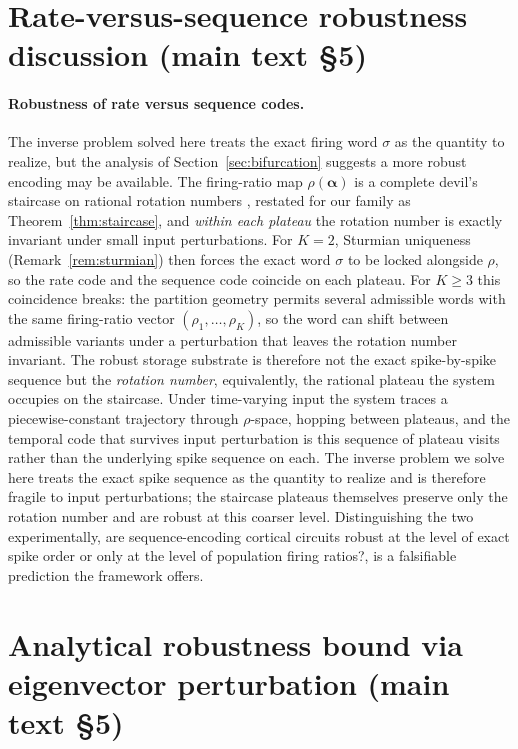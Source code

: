 \documentclass[12pt]{article}
\begin{document}
\section{Rate-versus-sequence robustness discussion (main text \S 5)}\label{app:rate-vs-seq}

\paragraph{Robustness of rate versus sequence codes.}
The inverse problem solved here treats the exact firing word $\sigma$ as the quantity to realize, but the analysis of Section~\ref{sec:bifurcation} suggests a more robust encoding may be available. The firing-ratio map $\rho(\boldsymbol{\alpha})$ is a complete devil's staircase on rational rotation numbers \citep[Arnold tongues for analytic circle maps;][]{arnold1961small,herman1979conjugaison}, restated for our family as Theorem~\ref{thm:staircase}, and \emph{within each plateau} the rotation number is exactly invariant under small input perturbations. For $K=2$, Sturmian uniqueness (Remark~\ref{rem:sturmian}) then forces the exact word $\sigma$ to be locked alongside $\rho$, so the rate code and the sequence code coincide on each plateau. For $K\geq 3$ this coincidence breaks: the partition geometry permits several admissible words with the same firing-ratio vector $(\rho_1,\ldots,\rho_K)$, so the word can shift between admissible variants under a perturbation that leaves the rotation number invariant. The robust storage substrate is therefore not the exact spike-by-spike sequence but the \emph{rotation number}, equivalently, the rational plateau the system occupies on the staircase. Under time-varying input the system traces a piecewise-constant trajectory through $\rho$-space, hopping between plateaus, and the temporal code that survives input perturbation is this sequence of plateau visits rather than the underlying spike sequence on each. The inverse problem we solve here treats the exact spike sequence as the quantity to realize and is therefore fragile to input perturbations; the staircase plateaus themselves preserve only the rotation number and are robust at this coarser level. Distinguishing the two experimentally, are sequence-encoding cortical circuits robust at the level of exact spike order or only at the level of population firing ratios?, is a falsifiable prediction the framework offers.


\section{Analytical robustness bound via eigenvector perturbation (main text \S 5)}\label{app:analyt-bound}
\end{document}
